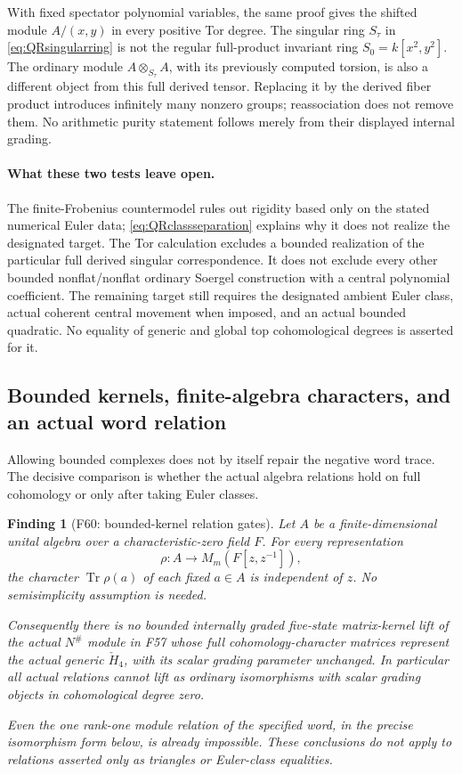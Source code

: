 \documentclass[11pt,a4paper]{article}
\newcommand{\fid}[1]{\textsf{#1}}\newcommand{\gate}[1]{\textsf{#1}}
\theoremstyle{named}\newtheorem{finding}{Finding}[section]
\theoremstyle{definition}\newtheorem{definition}[finding]{Definition}
\theoremstyle{remark}\newtheorem{remark}[finding]{Remark}
\begin{document}
With fixed spectator polynomial variables, the
same proof gives the shifted module \(A/(x,y)\)
in every positive Tor degree.
The singular ring \(S_\tau\) in
\eqref{eq:QRsingularring} is not the regular
full-product invariant ring \(S_0=k[x^2,y^2]\).
The ordinary module \(A\otimes_{S_\tau}A\), with
its previously computed torsion, is also a
different object from this full derived tensor.
Replacing it by the derived fiber product
introduces infinitely many nonzero groups;
reassociation does not remove them.
No arithmetic purity statement follows merely
from their displayed internal grading.

\paragraph{What these two tests leave open.}
The finite-Frobenius countermodel rules out
rigidity based only on the stated numerical
Euler data; \eqref{eq:QRclassseparation} explains
why it does not realize the designated target.
The Tor calculation excludes a bounded realization
of the particular full derived singular
correspondence. It does not exclude every other
bounded nonflat/nonflat ordinary Soergel
construction with a central polynomial coefficient.
The remaining target still requires the designated
ambient Euler class, actual coherent central
movement when imposed, and an actual bounded
quadratic. No equality of generic and global
top cohomological degrees is asserted for it.

\subsection{Bounded kernels, finite-algebra characters, and an actual word relation}
Allowing bounded complexes does not by itself repair the negative
word trace. The decisive comparison is whether the actual algebra
relations hold on full cohomology or only after taking Euler classes.

\begin{finding}[\fid{F60}: bounded-kernel relation gates]
\label{f:boundedkernelcharactergate}
Let \(A\) be a finite-dimensional unital algebra over a
characteristic-zero field \(F\). For every representation
\[
\rho:A\longrightarrow M_m(F[z,z^{-1}]),
\]
the character \(\operatorname{Tr}\rho(a)\) of each fixed
\(a\in A\) is independent of \(z\).
No semisimplicity assumption is needed.

Consequently there is no bounded internally graded five-state
matrix-kernel lift of the actual \(N^\#\) module in \fid{F57}
whose full cohomology-character matrices represent the actual
generic \(\check H_4\), with its scalar grading parameter unchanged.
In particular all actual relations cannot lift as ordinary
isomorphisms with scalar grading objects in cohomological degree zero.

Even the one rank-one module relation of the specified word,
in the precise isomorphism form below, is already impossible.
These conclusions do not apply to relations asserted only as
triangles or Euler-class equalities.
\end{finding}
\end{document}

